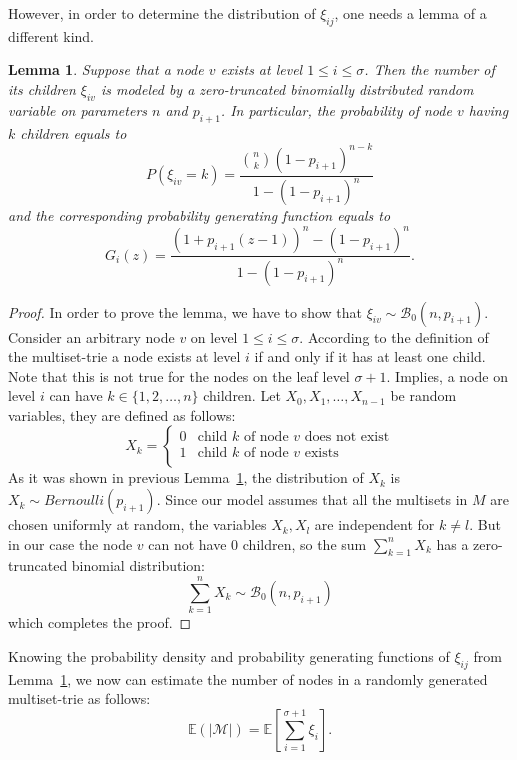 \documentclass[10pt,letterpaper]{article}
\newtheorem{lemma}{Lemma}
\begin{document}
However, in order to determine the distribution of $\xi_{ij}$, one needs a lemma of a different kind.

\begin{lemma}\label{l:prob-children}
Suppose that a node $v$ exists at level $1\leq i\leq\sigma$.
Then the number of its children $\xi_{iv}$ is modeled by a zero-truncated binomially
distributed random variable on parameters $n$ and $p_{i+1}$. In particular,
the probability of node $v$ having $k$ children equals to
\begin{equation}\label{eq:pdf}
P(\xi_{iv} = k) = \frac{\binom{n}{k} (1-p_{i+1})^{n-k}}{1-(1-p_{i+1})^n}
\end{equation}
and the corresponding probability generating function equals to
\begin{equation}\label{eq:generating_func}
G_i(z) = \frac{(1+p_{i+1}(z-1))^n - (1-p_{i+1})^n}{1-(1-p_{i+1})^n}.
\end{equation}
\end{lemma}
\begin{proof}
In order to prove the lemma, we have to show that
$\xi_{iv}\sim\mathcal{B}_0(n, p_{i+1}).$
Consider an arbitrary node $v$ on level $1\leq i\leq\sigma.$ According to the
definition of the multiset-trie a node exists at level $i$ if and only if
it has at least one child. Note that this is not true for the nodes on the leaf
level $\sigma + 1.$ Implies, a node on level $i$ can have
$k\in\{ 1,2,\ldots, n\}$ children. Let $X_0, X_1, \ldots, X_{n-1}$ be random
variables, they are defined as follows:
\[
X_k = \begin{cases}
0 & \textrm{child $k$ of node $v$ does not exist} \\
1 & \textrm{child $k$ of node $v$ exists} \\
\end{cases}
\]
As it was shown in previous Lemma~\ref{l:prob-children}, the distribution of 
$X_k$ is $X_k\sim Bernoulli(p_{i+1}).$ Since our model assumes that all the 
multisets in $M$ are chosen uniformly at random, the variables 
$X_k,X_l$ are independent for $k\neq l.$ But in our case the node $v$ can not 
have 0 children, so the sum $\sum_{k=1}^n X_k$ has a zero-truncated binomial 
distribution:
%
\[
\sum_{k=1}^n X_k \sim\mathcal{B}_0(n,p_{i+1})
\]
%
which completes the proof.

\end{proof}
%
Knowing the probability density and probability generating functions of $\xi_{ij}$ 
from Lemma~\ref{l:prob-children}, we now can estimate the number of nodes in 
a randomly generated multiset-trie as follows:
%
\begin{equation}\label{eq:num_nodes}
\mathbb{E}( | \mathcal{M} | ) = \mathbb{E}\left[ \sum_{i=1}^{\sigma+1} \xi_i \right].
\end{equation}
%
\end{document}
